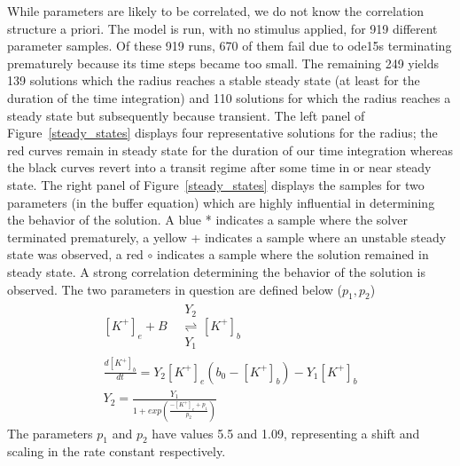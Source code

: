 While parameters are likely to be correlated, we do not know the correlation structure a priori. The model is run, with no stimulus applied, for 919 different parameter samples. Of these 919 runs, 670 of them fail due to ode15s terminating prematurely because its time steps became too small. The remaining 249 yields 139 solutions which the radius reaches a stable steady state (at least for the duration of the time integration) and 110 solutions for which the radius reaches a steady state but subsequently because transient. The left panel of Figure~\ref{steady_states} displays four representative solutions for the radius; the red curves remain in steady state for the duration of our time integration whereas the black curves revert into a transit regime after some time in or near steady state. The right panel of Figure~\ref{steady_states} displays the samples for two parameters (in the buffer equation) which are highly influential in determining the behavior of the solution. A blue * indicates a sample where the solver terminated prematurely, a yellow + indicates a sample where an unstable steady state was observed, a red $\circ$ indicates a sample where the solution remained in steady state. A strong correlation determining the behavior of the solution is observed. The two parameters in question are defined below ($p_1,p_2$)
\begin{eqnarray}\label{eqn:buff}
[K^+]_e+B \quad\begin{array}{c}
Y_2 \\ 
 \rightleftharpoons \\
Y_1
\end{array} 
[K^+]_b \nonumber \\
\frac{d[K^+]_b}{dt}=Y_2[K^+]_e(b_0-[K^+]_b)-Y_1[K^+]_b \nonumber \\
Y_2=\frac{Y_1}{1+exp(\frac{-[K^+]_e+p_1}{p_2})}
\end{eqnarray}
The parameters $p_1$ and $p_2$ have values 5.5 and 1.09, representing a shift and scaling in the rate constant respectively. 
